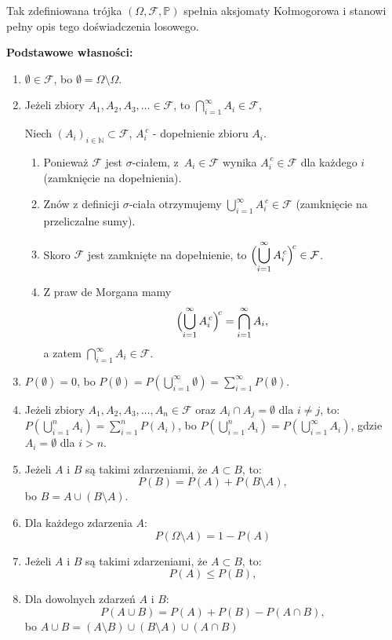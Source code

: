 \documentclass[final,a4paper,openany,12pt]{mwbk}
\begin{document}
Tak zdefiniowana trójka \((\Omega,\mathcal{F},\mathbb{P})\)
spełnia aksjomaty Kołmogorowa i stanowi pełny opis tego doświadczenia losowego.


\vspace{3mm}

\noindent\textbf{Podstawowe własności:}
\begin{enumerate}
    \item $\emptyset \in \mathcal{F}$, bo $\emptyset = \Omega \setminus \Omega$.

    \item Jeżeli zbiory $A_1, A_2, A_3, \dots \in \mathcal{F}$, to $\bigcap_{i=1}^{\infty} A_i \in \mathcal{F}$, 


Niech $(A_i)_{i\in\mathbb N}\subset\mathcal F$, $A_i^{\,c}$ - dopełnienie zbioru $A_i$.
\begin{enumerate}
  \item Ponieważ $\mathcal F$ jest $\sigma$-ciałem, z~$A_i\in\mathcal F$ wynika 
        $A_i^{\,c}\in\mathcal F$ dla każdego $i$ (zamknięcie na dopełnienia).
  \item Znów z definicji $\sigma$-ciała otrzymujemy 
        $\displaystyle\bigcup_{i=1}^\infty A_i^{\,c}\in\mathcal F$
        (zamknięcie na przeliczalne sumy).
  \item Skoro $\mathcal F$ jest zamknięte na dopełnienie, to
        $\displaystyle\Bigl(\bigcup_{i=1}^\infty A_i^{\,c}\Bigr)^{\!c}\in\mathcal F$.
  \item Z praw de Morgana mamy
        \[
          \Bigl(\bigcup_{i=1}^\infty A_i^{\,c}\Bigr)^{\!c}
          =\bigcap_{i=1}^\infty A_i,
        \]
        a zatem $\displaystyle\bigcap_{i=1}^\infty A_i\in\mathcal F$.
\end{enumerate}

    \item $P(\emptyset) = 0$, bo $P(\emptyset) = P\left(\bigcup_{i=1}^{\infty} \emptyset\right) = \sum_{i=1}^{\infty} P(\emptyset)$.

    \item Jeżeli zbiory $A_1, A_2, A_3, \dots, A_n \in \mathcal{F}$ oraz $A_i \cap A_j = \emptyset$ dla $i \neq j$, to:
    $P\left(\bigcup_{i=1}^{n} A_i\right) = \sum_{i=1}^{n} P(A_i)$, bo $P\left(\bigcup_{i=1}^{n} A_i\right) = P\left(\bigcup_{i=1}^{\infty} A_i\right)$, gdzie $A_i = \emptyset$ dla $i > n$.

    

    \item Jeżeli $A$ i $B$ są takimi zdarzeniami, że $A \subset B$, to:
    \[ P(B) = P(A) + P(B \setminus A), \] bo $B = A \cup (B \setminus A)$.

    \item Dla każdego zdarzenia $A$: \[ P(\Omega\setminus A) = 1 - P(A) \]

    \item Jeżeli $A$ i $B$ są takimi zdarzeniami, że $A \subset B$, to:
    \[ P(A) \leq P(B), \]

    \item Dla dowolnych zdarzeń $A$ i $B$:
    \[ P(A \cup B) = P(A) + P(B) - P(A \cap B), \] bo $A \cup B = (A \setminus B) \cup (B \setminus A) \cup (A \cap B)$
\end{enumerate}
\end{document}
